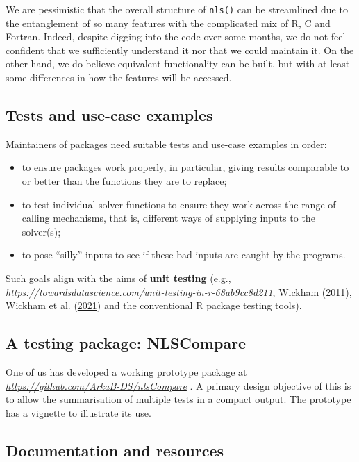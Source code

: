 \documentclass[
]{article}
\providecommand{\tightlist}{%
  \setlength{\itemsep}{0pt}\setlength{\parskip}{0pt}}
\begin{document}
We are pessimistic that the overall structure of \texttt{nls()} can be
streamlined due to the entanglement of so many features with the
complicated mix of R, C and Fortran. Indeed, despite digging into the
code over some months, we do not feel confident that we sufficiently
understand it nor that we could maintain it. On the other hand, we do
believe equivalent functionality can be built, but with at least some
differences in how the features will be accessed.

\hypertarget{tests-and-use-case-examples}{%
\subsection{Tests and use-case
examples}\label{tests-and-use-case-examples}}

Maintainers of packages need suitable tests and use-case examples in
order:

\begin{itemize}
\tightlist
\item
  to ensure packages work properly, in particular, giving results
  comparable to or better than the functions they are to replace;
\item
  to test individual solver functions to ensure they work across the
  range of calling mechanisms, that is, different ways of supplying
  inputs to the solver(s);
\item
  to pose ``silly'' inputs to see if these bad inputs are caught by the
  programs.
\end{itemize}

Such goals align with the aims of \textbf{unit testing} (e.g.,
\emph{\url{https://towardsdatascience.com/unit-testing-in-r-68ab9cc8d211}},
Wickham (\protect\hyperlink{ref-HWtestthat11}{2011}), Wickham et al.
(\protect\hyperlink{ref-HWdevtools21}{2021}) and the conventional R
package testing tools).

\hypertarget{a-testing-package-nlscompare}{%
\subsection{A testing package:
NLSCompare}\label{a-testing-package-nlscompare}}

One of us has developed a working prototype package at
\emph{\url{https://github.com/ArkaB-DS/nlsCompare}} . A primary design
objective of this is to allow the summarisation of multiple tests in a
compact output. The prototype has a vignette to illustrate its use.

\hypertarget{documentation-and-resources}{%
\subsection{Documentation and
resources}\label{documentation-and-resources}}
\end{document}
